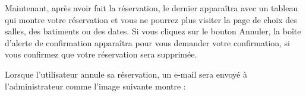 \documentclass{article}
\begin{document}
\begin{enumerate}
               \noindent{}  
  
  
  
	Maintenant, après avoir fait la réservation, le dernier apparaîtra avec un tableau qui montre votre réservation et vous ne pourrez plus visiter la page de choix des salles, des batiments ou des dates. Si vous cliquez sur le bouton Annuler, la boîte d'alerte de confirmation apparaîtra pour vous demander votre confirmation, si vous confirmez que votre réservation sera supprimée.
  
  \vspace{0.7cm}
               \hspace*{-0.7in}
               \noindent{}
  
  
Lorsque l'utilisateur annule sa réservation, un e-mail sera envoyé à l'administrateur comme l'image suivante montre :  
  

\end{enumerate}
\end{document}
